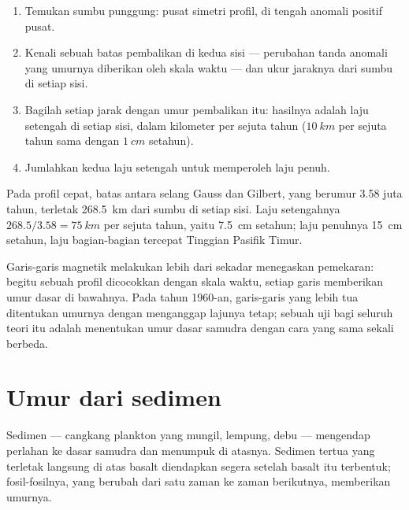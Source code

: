 \begin{method}\label{met:g11:drift-to-spreading:rate}
\begin{enumerate}
  \item Temukan sumbu punggung: pusat simetri profil, di tengah anomali
        positif pusat.
  \item Kenali sebuah batas pembalikan di kedua sisi --- perubahan tanda
        anomali yang umurnya diberikan oleh skala waktu --- dan ukur jaraknya
        dari sumbu di setiap sisi.
  \item Bagilah setiap jarak dengan umur pembalikan itu: hasilnya adalah laju
        setengah di setiap sisi, dalam kilometer per sejuta tahun
        ($\qty{10}{km}$ per sejuta tahun sama dengan $\qty{1}{cm}$ setahun).
  \item Jumlahkan kedua laju setengah untuk memperoleh laju penuh.
\end{enumerate}
\end{method}

\begin{example}\label{ex:g11:drift-to-spreading:fast}
Pada profil cepat, batas antara selang Gauss dan Gilbert, yang berumur
\num{3.58} juta tahun, terletak \qty{268.5}{km} dari sumbu di setiap sisi.
Laju setengahnya $268.5/3.58 = \qty{75}{km}$ per sejuta tahun, yaitu
\qty{7.5}{cm} setahun; laju penuhnya \qty{15}{cm} setahun, laju bagian-bagian
tercepat Tinggian Pasifik Timur.
\end{example}

Garis-garis magnetik melakukan lebih dari sekadar menegaskan pemekaran: begitu
sebuah profil dicocokkan dengan skala waktu, setiap garis memberikan umur dasar
di bawahnya. Pada tahun 1960-an, garis-garis yang lebih tua ditentukan umurnya
dengan menganggap lajunya tetap; sebuah uji bagi seluruh teori itu adalah
menentukan umur dasar samudra dengan cara yang sama sekali berbeda.

\section{Umur dari sedimen}

Sedimen --- cangkang plankton yang mungil, lempung, debu --- mengendap perlahan
ke dasar samudra dan menumpuk di atasnya. Sedimen tertua yang terletak
langsung di atas basalt diendapkan segera setelah basalt itu terbentuk;
fosil-fosilnya, yang berubah dari satu zaman ke zaman berikutnya, memberikan
umurnya.


